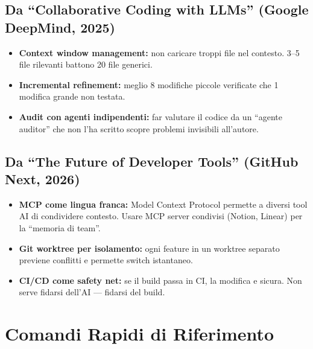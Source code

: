 \documentclass[11pt,a4paper]{article}
\begin{document}
\subsection{Da ``Collaborative Coding with LLMs'' (Google DeepMind, 2025)}

\begin{itemize}[leftmargin=2em]
  \item \textbf{Context window management:} non caricare troppi file nel contesto. 3--5 file rilevanti battono 20 file generici.
  \item \textbf{Incremental refinement:} meglio 8 modifiche piccole verificate che 1 modifica grande non testata.
  \item \textbf{Audit con agenti indipendenti:} far valutare il codice da un ``agente auditor'' che non l'ha scritto scopre problemi invisibili all'autore.
\end{itemize}

\subsection{Da ``The Future of Developer Tools'' (GitHub Next, 2026)}

\begin{itemize}[leftmargin=2em]
  \item \textbf{MCP come lingua franca:} Model Context Protocol permette a diversi tool AI di condividere contesto. Usare MCP server condivisi (Notion, Linear) per la ``memoria di team''.
  \item \textbf{Git worktree per isolamento:} ogni feature in un worktree separato previene conflitti e permette switch istantaneo.
  \item \textbf{CI/CD come safety net:} se il build passa in CI, la modifica e sicura. Non serve fidarsi dell'AI --- fidarsi del build.
\end{itemize}

\section{Comandi Rapidi di Riferimento}
\end{document}

